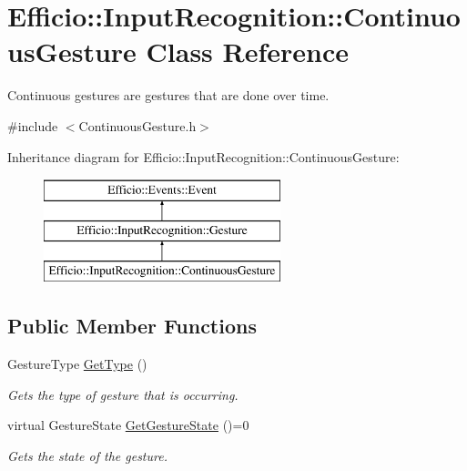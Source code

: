 \hypertarget{class_efficio_1_1_input_recognition_1_1_continuous_gesture}{}\section{Efficio\+:\+:Input\+Recognition\+:\+:Continuous\+Gesture Class Reference}
\label{class_efficio_1_1_input_recognition_1_1_continuous_gesture}


Continuous gestures are gestures that are done over time.  




{\ttfamily \#include $<$Continuous\+Gesture.\+h$>$}

Inheritance diagram for Efficio\+:\+:Input\+Recognition\+:\+:Continuous\+Gesture\+:\begin{figure}[H]
\begin{center}
\leavevmode
\includegraphics[height=3.000000cm]{class_efficio_1_1_input_recognition_1_1_continuous_gesture}
\end{center}
\end{figure}
\subsection*{Public Member Functions}
\begin{DoxyCompactItemize}
\item 
\hypertarget{class_efficio_1_1_input_recognition_1_1_continuous_gesture_aee0a3469492e3faed4dca28179645449}{}\label{class_efficio_1_1_input_recognition_1_1_continuous_gesture_aee0a3469492e3faed4dca28179645449} 
Gesture\+Type \hyperlink{class_efficio_1_1_input_recognition_1_1_continuous_gesture_aee0a3469492e3faed4dca28179645449}{Get\+Type} ()
\begin{DoxyCompactList}\small\item\em Gets the type of gesture that is occurring. \end{DoxyCompactList}\item 
\hypertarget{class_efficio_1_1_input_recognition_1_1_continuous_gesture_a29e6beed9d0f1745200412815974db7e}{}\label{class_efficio_1_1_input_recognition_1_1_continuous_gesture_a29e6beed9d0f1745200412815974db7e} 
virtual Gesture\+State \hyperlink{class_efficio_1_1_input_recognition_1_1_continuous_gesture_a29e6beed9d0f1745200412815974db7e}{Get\+Gesture\+State} ()=0
\begin{DoxyCompactList}\small\item\em Gets the state of the gesture. \end{DoxyCompactList}\end{DoxyCompactItemize}


